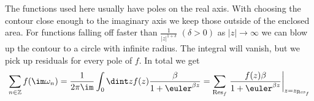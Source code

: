 \documentclass[a4paper,12pt]{uiofysmaster}
\begin{document}
The functions used here usually have poles on the real axis. 
With choosing the contour close enough to the imaginary axis we keep those outside of the enclosed area.
For functions falling off faster than $\frac{1}{|z|^{1+\delta}}$ $(\delta>0)$ as $|z|\rightarrow \infty$ we can blow up the contour to a
circle with infinite radius. The integral will vanish, but we pick up residuals for every pole of $f$.
In total we get
\begin{equation}
 \sum_{n\in\mathbb{Z}} f(\im \omega_n) = \frac{1}{2\pi \im} \int_0 \dint z f(z)\frac{\beta}{1+\euler^{\beta z }} 
 = \sum_{\mathrm{Res}_f} \left. \frac{f(z)\beta}{1+\euler^{\beta z }}\right|_{z=z_{\mathrm{Res}_f}}
\end{equation}





\end{document}
